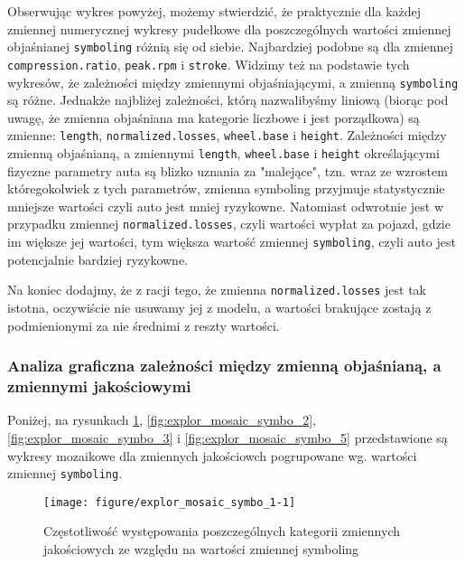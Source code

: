 \documentclass[12pt, a4paper]{article}\usepackage[]{graphicx}\usepackage[]{xcolor}
\makeatletter
\def\maxwidth{ %
  \ifdim\Gin@nat@width>\linewidth
    \linewidth
  \else
    \Gin@nat@width
  \fi
}
\newenvironment{knitrout}{}{} %
\makeatother
\begin{document}
Obserwując wykres powyżej, możemy stwierdzić, że praktycznie dla każdej zmiennej numerycznej wykresy pudełkowe dla poszczególnych wartości zmiennej objaśnianej \texttt{symboling} różnią się od siebie. Najbardziej podobne są dla zmiennej \texttt{compression.ratio}, \texttt{peak.rpm} i \texttt{stroke}.  Widzimy też na podstawie tych wykresów, że zależności między zmiennymi objaśniającymi, a zmienną \texttt{symboling} są różne. Jednakże najbliżej zależności, którą nazwalibyśmy liniową (biorąc pod uwagę, że zmienna objaśniana ma kategorie liczbowe i jest porządkowa) są zmienne: \texttt{length}, \texttt{normalized.losses}, \texttt{wheel.base} i \texttt{height}. Zależności między zmienną objaśnianą, a zmiennymi \texttt{length}, \texttt{wheel.base} i \texttt{height} określającymi fizyczne parametry auta są blizko uznania za "malejące", tzn. wraz ze wzrostem któregokolwiek z tych parametrów, zmienna symboling przyjmuje statystycznie mniejsze wartości czyli auto jest mniej ryzykowne. Natomiast odwrotnie jest w przypadku zmiennej \texttt{normalized.losses}, czyli wartości wypłat za pojazd, gdzie im większe jej wartości, tym większa wartość zmiennej \texttt{symboling}, czyli auto jest potencjalnie bardziej ryzykowne.
\par
Na koniec dodajmy, że z racji tego, że zmienna \texttt{normalized.losses} jest tak istotna, oczywiście nie usuwamy jej z modelu, a wartości brakujące zostają z podmienionymi za nie średnimi z reszty wartości.

\subsubsection{Analiza graficzna zależności między zmienną objaśnianą, a zmiennymi jakościowymi}

\par
Poniżej, na rysunkach \ref{fig:explor_mosaic_symbo_1}, \ref{fig:explor_mosaic_symbo_2}, \ref{fig:explor_mosaic_symbo_3} i \ref{fig:explor_mosaic_symbo_5} przedstawione są wykresy mozaikowe dla zmiennych jakościowch pogrupowane wg. wartości  zmiennej \texttt{symboling}.

\begin{knitrout}
\color{fgcolor}\begin{figure}[H]

{\centering \texttt{[image: figure/explor\_mosaic\_symbo\_1-1]} 

}

\caption[Częstotliwość występowania poszczególnych kategorii zmiennych jakościowych ze względu na wartości zmiennej symboling]{Częstotliwość występowania poszczególnych kategorii zmiennych jakościowych ze względu na wartości zmiennej symboling}\label{fig:explor_mosaic_symbo_1}
\end{figure}

\end{knitrout}
\end{document}
